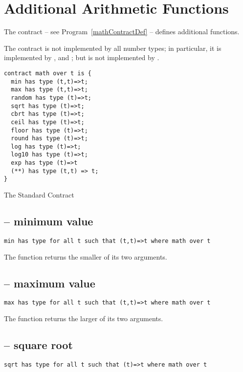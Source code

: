\section{Additional Arithmetic Functions}
\label{mathContract}
The  contract -- see Program~\vref{mathContractDef} -- defines additional functions.

\begin{aside}
The  contract is not implemented by all number types; in particular, it is implemented by ,  and ; but is not implemented by .
\end{aside}

\begin{program}
\begin{lstlisting}
contract math over t is {
  min has type (t,t)=>t;
  max has type (t,t)=>t;
  random has type (t)=>t;
  sqrt has type (t)=>t;
  cbrt has type (t)=>t;
  ceil has type (t)=>t;
  floor has type (t)=>t;
  round has type (t)=>t;
  log has type (t)=>t;
  log10 has type (t)=>t;
  exp has type (t)=>t
  (**) has type (t,t) => t;
}
\end{lstlisting}
\caption{The Standard  Contract\label{mathContractDef}}
\end{program}

\subsection{ -- minimum value}
\begin{lstlisting}
min has type for all t such that (t,t)=>t where math over t
\end{lstlisting}

The  function returns the smaller of its two arguments.

\subsection{ -- maximum value}
\begin{lstlisting}
max has type for all t such that (t,t)=>t where math over t
\end{lstlisting}

The  function returns the larger of its two arguments.

\subsection{ -- square root}
\begin{lstlisting}
sqrt has type for all t such that (t)=>t where math over t
\end{lstlisting}

